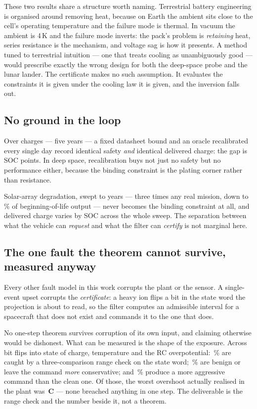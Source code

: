 \documentclass[11pt,letterpaper]{article}
\theoremstyle{definition}
\theoremstyle{remark}
\newcommand{\SI}[2]{#1\,#2}
\newcommand{\degreeCelsius}{\degC}
\newcommand{\degC}{\ifmmode{^\circ}\mathrm{C}\else\textdegree C\fi}
\begin{document}
These two results share a structure worth naming. Terrestrial battery engineering is organised
around removing heat, because on Earth the ambient sits close to the cell's operating
temperature and the failure mode is thermal. In vacuum the ambient is 4\,K and the failure mode
inverts: the pack's problem is \emph{retaining} heat, series resistance is the mechanism, and
voltage sag is how it presents. A method tuned to terrestrial intuition --- one that treats
cooling as unambiguously good --- would prescribe exactly the wrong design for both the
deep-space probe and the lunar lander. The certificate makes no such assumption. It evaluates
the constraints it is given under the cooling law it is given, and the inversion falls out.

\subsection{No ground in the loop}

Over \sNoGroundDays{} charges --- five years --- a fixed datasheet bound and an oracle
recalibrated every single day record identical safety \emph{and} identical delivered charge: the
gap is \sNoGroundGap{} SOC points. In deep space, recalibration buys not just no safety but no
performance either, because the binding constraint is the plating corner rather than resistance.

Solar-array degradation, swept to \sArrayYears{} years --- three times any real mission, down to
\sArrayFrac\,\% of beginning-of-life output --- never becomes the binding constraint at all, and
delivered charge varies by \sArraySpread{} SOC across the whole sweep. The separation between
what the vehicle can \emph{request} and what the filter can \emph{certify} is not marginal here.

\subsection{The one fault the theorem cannot survive, measured anyway}

Every other fault model in this work corrupts the plant or the sensor. A single-event upset
corrupts the \emph{certificate}: a heavy ion flips a bit in the state word the projection is
about to read, so the filter computes an admissible interval for a spacecraft that does not
exist and commands it to the one that does.

No one-step theorem survives corruption of its own input, and claiming otherwise would be
dishonest. What can be measured is the shape of the exposure. Across \sSeuFlips{} bit flips into
state of charge, temperature and the RC overpotential: \sSeuCaught\,\% are caught by a
three-comparison range check on the state word; \sSeuBenign\,\% are benign or leave the command
\emph{more} conservative; and \sSeuAggr\,\% produce a more aggressive command than the clean
one. Of those, the worst overshoot actually realised in the plant was
\textbf{\SI{\sSeuOvershoot}{\degreeCelsius}} --- none breached anything in one step. The deliverable is the
range check and the number beside it, not a theorem.
\end{document}
